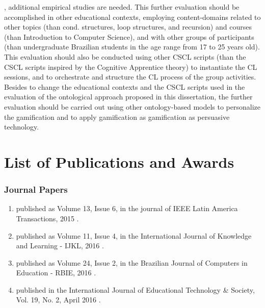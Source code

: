 , additional empirical studies are needed.
This further evaluation should be accomplished in other educational contexts, employing content-domains related to other topics (than cond. structures, loop structures, and recursion) and courses (than Introduction to Computer Science), and with other groups of participants (than undergraduate Brazilian students in the age range from 17 to 25 years old).
This evaluation should also be conducted using other CSCL scripts (than the CSCL scripts inspired by the Cognitive Apprentice theory) to instantiate the CL sessions, and to orchestrate and structure the CL process of the group activities.
Besides to change the educational contexts and the CSCL scripts used in the evaluation of the ontological approach proposed in this dissertation, the further evaluation should be carried out using other ontology-based models to personalize the gamification and to apply gamification as gamification as persuasive technology.

\section{List of Publications and Awards}

\subsubsection*{Journal Papers}

\begin{enumerate}
\item
{} published as Volume 13, Issue 6, in the journal of IEEE Latin America Transactions, 2015 \cite{ChallcoMoreiraBittencourtMizoguchiIsotani2015}.

\item
{} published as Volume 11, Issue 4, in the International Journal of Knowledge and Learning - IJKL, 2016
\cite{ChallcoBittencourtIsotani2016}.


\item
{} published as Volume 24, Issue 2, in the Brazilian Journal of Computers in Education - RBIE, 2016 \cite{ChallcoMizoguchiIsotani2016}.

\item
{} published in the International Journal of Educational Technology \& Society, Vol. 19, No. 2, April 2016 \cite{ChallcoAndradeBorgesBittencourtIsotani2016}.
\end{enumerate}

